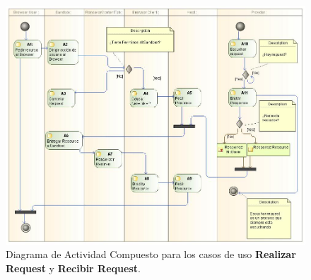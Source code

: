 \begin{figure}[h!t]
    \centering
    \includegraphics[scale=0.45]{figures/chap5/activityDiag_2.jpg}
    \caption{Diagrama de Actividad Compuesto para los casos de uso \textbf{Realizar Request} y \textbf{Recibir Request}.}
    \label{fig:ActDiagr}
\end{figure}


